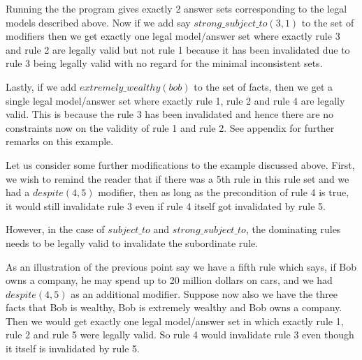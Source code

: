 Running the the program gives exactly 2 answer sets corresponding to the legal models described above. Now if we add say $strong\_subject\_to(3,1)$ to the set of modifiers then we get exactly one legal model/answer set where exactly rule 3 and rule 2 are legally valid but not rule 1 because it has been invalidated due to rule 3 being legally valid with no regard for the minimal inconsistent sets.

Lastly, if we add $extremely\_wealthy(bob)$ to the set of facts, then we get a single legal model/answer set where exactly rule 1, rule 2 and rule 4 are legally valid. This is because the rule 3 has been invalidated and hence there are no constraints now on the validity of rule 1 and rule 2. See appendix for further remarks on this example.


Let us consider some further modifications to the example discussed above. First, we wish to remind the reader that if there was a 5th rule in this rule set and we had a $despite(4,5)$ modifier, then as long as the precondition of rule 4 is true, it would still invalidate rule 3 even if rule 4 itself got invalidated by rule 5.

However, in the case of $subject\_to$ and $strong\_subject\_to$, the dominating rules needs to be legally valid to invalidate the subordinate rule. 

As an illustration of the previous point say we have a fifth rule which says, if Bob owns a company, he may spend up to 20 million dollars on cars, and we had $despite(4,5)$ as an additional modifier. Suppose now also we have the three facts that Bob is wealthy, Bob is extremely wealthy and Bob owns a company. Then we would get exactly one legal model/answer set in which exactly rule 1, rule 2 and rule 5 were legally valid. So rule 4 would invalidate rule 3 even though it itself is invalidated by rule 5. 






